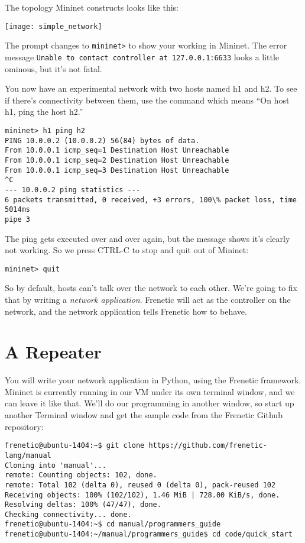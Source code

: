 The topology Mininet constructs looks like this:

\texttt{[image: simple\_network]}

The prompt changes to {\tt mininet>} to show your working in Mininet.  
The error message {\tt Unable to contact controller at 127.0.0.1:6633} looks a little ominous, but it's not fatal.  

You now have an experimental network with two hosts named h1 and h2.  
To see if there's connectivity between them, use the command  which means 
``On host h1, ping the host h2.''

\begin{verbatim}
mininet> h1 ping h2
PING 10.0.0.2 (10.0.0.2) 56(84) bytes of data.
From 10.0.0.1 icmp_seq=1 Destination Host Unreachable
From 10.0.0.1 icmp_seq=2 Destination Host Unreachable
From 10.0.0.1 icmp_seq=3 Destination Host Unreachable
^C
--- 10.0.0.2 ping statistics ---
6 packets transmitted, 0 received, +3 errors, 100\% packet loss, time 5014ms
pipe 3
\end{verbatim}

The ping gets executed over and over again, but the  message
shows it's clearly not working.  So we press CTRL-C to stop and 
quit out of Mininet:

\begin{verbatim}
mininet> quit
\end{verbatim}

So by default, hosts can't talk over the network to each other.  We're going to fix that by writing a {\it network
application}.    Frenetic will act as the controller on the network, and the network application tells 
Frenetic how to behave.

\section{A Repeater}

You will write your network application in Python, using the Frenetic framework.  
Mininet is currently running in our VM under its own terminal window, and we can leave it like that.   
We'll do our programming in another window, so start up another Terminal window and
get the sample code from the Frenetic Github repository:

\begin{verbatim}
frenetic@ubuntu-1404:~$ git clone https://github.com/frenetic-lang/manual
Cloning into 'manual'...
remote: Counting objects: 102, done.
remote: Total 102 (delta 0), reused 0 (delta 0), pack-reused 102
Receiving objects: 100% (102/102), 1.46 MiB | 728.00 KiB/s, done.
Resolving deltas: 100% (47/47), done.
Checking connectivity... done.
frenetic@ubuntu-1404:~$ cd manual/programmers_guide
frenetic@ubuntu-1404:~/manual/programmers_guide$ cd code/quick_start
\end{verbatim}

